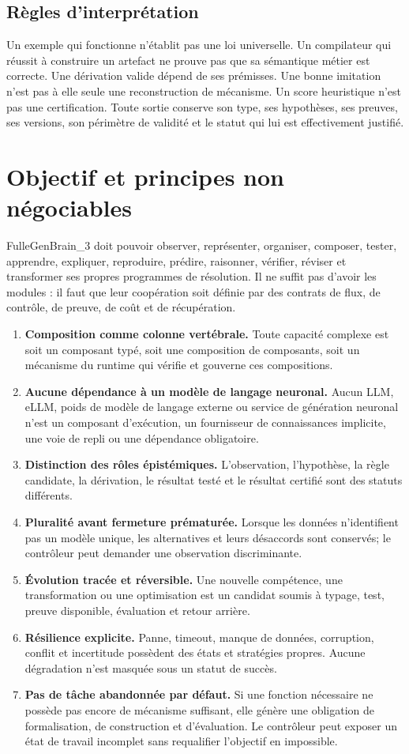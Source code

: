 \documentclass[11pt,a4paper]{article}
\begin{document}
\subsection{Règles d'interprétation}
Un exemple qui fonctionne n'établit pas une loi universelle. Un compilateur qui réussit à construire un artefact ne prouve pas que sa sémantique métier est correcte. Une dérivation valide dépend de ses prémisses. Une bonne imitation n'est pas à elle seule une reconstruction de mécanisme. Un score heuristique n'est pas une certification. Toute sortie conserve son type, ses hypothèses, ses preuves, ses versions, son périmètre de validité et le statut qui lui est effectivement justifié.

\section{Objectif et principes non négociables}
FulleGenBrain\_3 doit pouvoir observer, représenter, organiser, composer, tester, apprendre, expliquer, reproduire, prédire, raisonner, vérifier, réviser et transformer ses propres programmes de résolution. Il ne suffit pas d'avoir les modules : il faut que leur coopération soit définie par des contrats de flux, de contrôle, de preuve, de coût et de récupération.

\begin{enumerate}
\item \textbf{Composition comme colonne vertébrale.} Toute capacité complexe est soit un composant typé, soit une composition de composants, soit un mécanisme du runtime qui vérifie et gouverne ces compositions.
\item \textbf{Aucune dépendance à un modèle de langage neuronal.} Aucun LLM, eLLM, poids de modèle de langage externe ou service de génération neuronal n'est un composant d'exécution, un fournisseur de connaissances implicite, une voie de repli ou une dépendance obligatoire.
\item \textbf{Distinction des rôles épistémiques.} L'observation, l'hypothèse, la règle candidate, la dérivation, le résultat testé et le résultat certifié sont des statuts différents.
\item \textbf{Pluralité avant fermeture prématurée.} Lorsque les données n'identifient pas un modèle unique, les alternatives et leurs désaccords sont conservés; le contrôleur peut demander une observation discriminante.
\item \textbf{Évolution tracée et réversible.} Une nouvelle compétence, une transformation ou une optimisation est un candidat soumis à typage, test, preuve disponible, évaluation et retour arrière.
\item \textbf{Résilience explicite.} Panne, timeout, manque de données, corruption, conflit et incertitude possèdent des états et stratégies propres. Aucune dégradation n'est masquée sous un statut de succès.
\item \textbf{Pas de tâche abandonnée par défaut.} Si une fonction nécessaire ne possède pas encore de mécanisme suffisant, elle génère une obligation de formalisation, de construction et d'évaluation. Le contrôleur peut exposer un état de travail incomplet sans requalifier l'objectif en impossible.
\end{enumerate}
\end{document}
